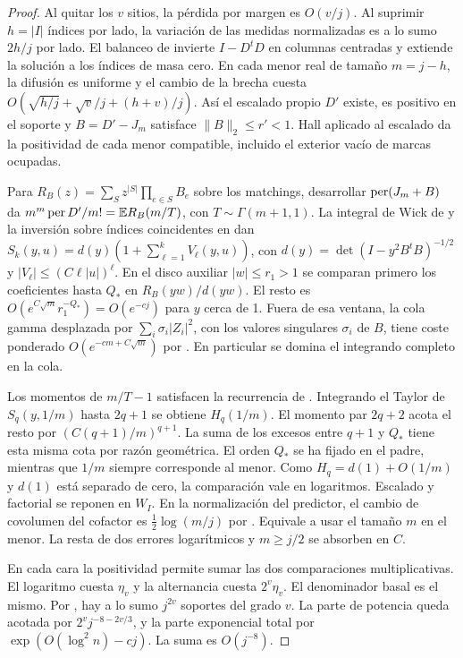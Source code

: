\begin{proof}
Al quitar los \(v\) sitios, la pérdida por margen es \(O(v/j)\). Al suprimir \(h=|I|\)
índices por lado, la variación de las medidas normalizadas es a lo sumo \(2h/j\) por lado.
El balanceo de  invierte \(I-D^tD\) en columnas centradas y extiende la
solución a los índices de masa cero. En cada menor real de tamaño \(m=j-h\), la difusión
es uniforme y el cambio de la brecha cuesta \(O(\sqrt{h/j}+\sqrt v/j+(h+v)/j)\).
Así el escalado propio \(D'\) existe, es positivo en el soporte y
\(B=D'-J_m\) satisface \(\|B\|_2\le r'<1\). Hall aplicado al escalado da la
positividad de cada menor compatible, incluido el exterior vacío de marcas ocupadas.

Para \(R_B(z)=\sum_S z^{|S|}\prod_{e\in S}B_e\) sobre los matchings, desarrollar
\(\operatorname{per}(J_m+B)\) da \(m^m\operatorname{per} D'/m!=\mathbb E R_B(m/T)\), con \(T\sim\Gamma(m+1,1)\).
La integral de Wick de  y la inversión sobre índices coincidentes en
 dan \(S_k(y,u)=d(y)(1+\sum_{\ell=1}^k V_\ell(y,u))\), con
\(d(y)=\det(I-y^2 B^tB)^{-1/2}\) y \(|V_\ell|\le(C\ell|u|)^\ell\). En el disco auxiliar
\(|w|\le r_1>1\) se comparan primero los coeficientes hasta \(Q_*\) en \(R_B(yw)/d(yw)\).
El resto es \(O(e^{C\sqrt m}r_1^{-Q_*})=O(e^{-cj})\) para \(y\) cerca de 1.
Fuera de esa ventana, la cola gamma desplazada por \(\sum_i\sigma_i|Z_i|^2\), con los
valores singulares \(\sigma_i\) de \(B\), tiene coste ponderado \(O(e^{-cm+C\sqrt m})\)
por . En particular se domina el integrando completo en la cola.

Los momentos de \(m/T-1\) satisfacen la recurrencia de . Integrando el
Taylor de \(S_q(y,1/m)\) hasta \(2q+1\) se obtiene \(H_q(1/m)\). El momento par
\(2q+2\) acota el resto por \((C(q+1)/m)^{q+1}\). La suma de los excesos entre
\(q+1\) y \(Q_*\) tiene esta misma cota por razón geométrica. El orden \(Q_*\) se ha fijado
en el padre, mientras que \(1/m\) siempre corresponde al menor. Como \(H_q=d(1)+O(1/m)\)
y \(d(1)\) está separado de cero, la comparación vale en logaritmos. Escalado y factorial
se reponen en \(W_I\). En la normalización del predictor, el cambio de covolumen del
cofactor es \(\tfrac12\log(m/j)\) por . Equivale a usar el tamaño \(m\)
en el menor. La resta de dos errores logarítmicos y \(m\ge j/2\) se absorben en \(C\).

En cada cara la positividad permite sumar las dos comparaciones multiplicativas. El
logaritmo cuesta \(\eta_v\) y la alternancia cuesta \(2^v\eta_v\). El denominador basal
es el mismo. Por , hay a lo sumo \(j^{2v}\) soportes del grado \(v\).
La parte de potencia queda acotada por \(2^v j^{-8-2v/3}\), y la parte exponencial
total por \(\exp(O(\log^2 n)-cj)\). La suma es \(O(j^{-8})\).
\end{proof}
